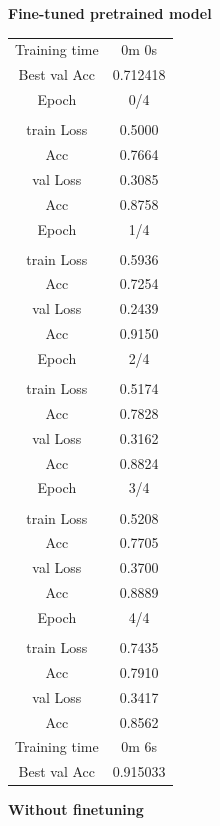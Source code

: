 \documentclass[12 pt]{article}        	%
\begin{document}
\begin{multicols}{2}

\textbf{Fine-tuned pretrained model} \\

\begin{tabular}{ | c | c | } \hline
  Training time & 0m 0s \\
  Best val Acc & 0.712418 \\
  Epoch & 0/4 \\ \hline
        & \\
  train Loss & 0.5000 \\
  Acc & 0.7664 \\
  val Loss & 0.3085 \\
  Acc & 0.8758 \\
  Epoch & 1/4 \\ \hline
         & \\
  train Loss & 0.5936 \\
  Acc & 0.7254 \\
  val Loss & 0.2439 \\
  Acc & 0.9150 \\
  Epoch & 2/4 \\ \hline
        & \\
  train Loss & 0.5174 \\
  Acc & 0.7828 \\
  val Loss & 0.3162 \\
  Acc & 0.8824 \\
  Epoch & 3/4 \\ \hline
        & \\
  train Loss & 0.5208 \\
  Acc & 0.7705 \\
  val Loss & 0.3700 \\
  Acc & 0.8889 \\
  Epoch & 4/4 \\ \hline
        & \\
  train Loss & 0.7435 \\
  Acc & 0.7910 \\
  val Loss & 0.3417 \\
  Acc & 0.8562 \\
  Training time & 0m 6s \\
  Best val Acc & 0.915033 \\ \hline
\end{tabular}

\textbf{Without finetuning} \\


\end{multicols}
\end{document}
